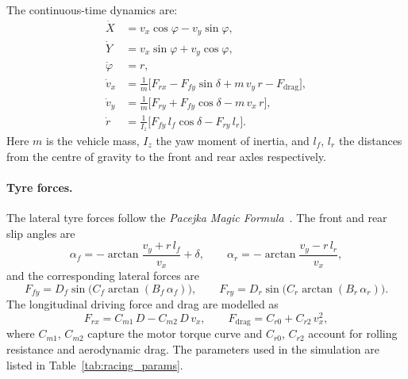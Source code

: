 The continuous-time dynamics are:
\begin{equation}\label{eq:racing_dynamics}
	\begin{aligned}
		\dot X &= v_x \cos\varphi - v_y \sin\varphi, \\
		\dot Y &= v_x \sin\varphi + v_y \cos\varphi, \\
		\dot\varphi &= r, \\
		\dot v_x &= \tfrac{1}{m}\bigl[F_{rx} - F_{fy}\sin\delta + m\,v_y\,r - F_{\mathrm{drag}}\bigr], \\
		\dot v_y &= \tfrac{1}{m}\bigl[F_{ry} + F_{fy}\cos\delta - m\,v_x\,r\bigr], \\
		\dot r &= \tfrac{1}{I_z}\bigl[F_{fy}\,l_f\cos\delta - F_{ry}\,l_r\bigr].
	\end{aligned}
\end{equation}
Here $m$ is the vehicle mass, $I_z$ the yaw moment of inertia, and $l_f$, $l_r$ the distances from the centre of gravity to the front and rear axles respectively.

\paragraph{Tyre forces.} The lateral tyre forces follow the \emph{Pacejka Magic Formula}~\cite{pacejka2012}. The front and rear slip angles are
\begin{equation*}
	\alpha_f = -\arctan\!\frac{v_y + r\,l_f}{v_x} + \delta, \qquad
	\alpha_r = -\arctan\!\frac{v_y - r\,l_r}{v_x},
\end{equation*}
and the corresponding lateral forces are
\begin{equation*}
	F_{fy} = D_f \sin\!\bigl(C_f \arctan(B_f\,\alpha_f)\bigr), \qquad
	F_{ry} = D_r \sin\!\bigl(C_r \arctan(B_r\,\alpha_r)\bigr).
\end{equation*}
The longitudinal driving force and drag are modelled as
\begin{equation*}
	F_{rx} = C_{m1}\,D - C_{m2}\,D\,v_x, \qquad
	F_{\mathrm{drag}} = C_{r0} + C_{r2}\,v_x^2,
\end{equation*}
where $C_{m1}$, $C_{m2}$ capture the motor torque curve and $C_{r0}$, $C_{r2}$ account for rolling resistance and aerodynamic drag. The parameters used in the simulation are listed in Table~\ref{tab:racing_params}.

